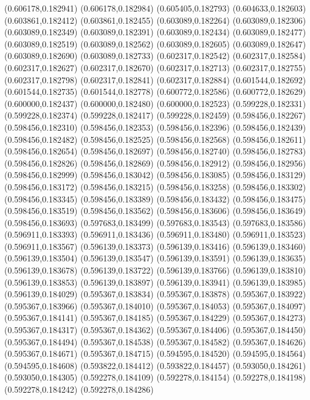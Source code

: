(0.606178,0.182941)
(0.606178,0.182984)
(0.605405,0.182793)
(0.604633,0.182603)
(0.603861,0.182412)
(0.603861,0.182455)
(0.603089,0.182264)
(0.603089,0.182306)
(0.603089,0.182349)
(0.603089,0.182391)
(0.603089,0.182434)
(0.603089,0.182477)
(0.603089,0.182519)
(0.603089,0.182562)
(0.603089,0.182605)
(0.603089,0.182647)
(0.603089,0.182690)
(0.603089,0.182733)
(0.602317,0.182542)
(0.602317,0.182584)
(0.602317,0.182627)
(0.602317,0.182670)
(0.602317,0.182713)
(0.602317,0.182755)
(0.602317,0.182798)
(0.602317,0.182841)
(0.602317,0.182884)
(0.601544,0.182692)
(0.601544,0.182735)
(0.601544,0.182778)
(0.600772,0.182586)
(0.600772,0.182629)
(0.600000,0.182437)
(0.600000,0.182480)
(0.600000,0.182523)
(0.599228,0.182331)
(0.599228,0.182374)
(0.599228,0.182417)
(0.599228,0.182459)
(0.598456,0.182267)
(0.598456,0.182310)
(0.598456,0.182353)
(0.598456,0.182396)
(0.598456,0.182439)
(0.598456,0.182482)
(0.598456,0.182525)
(0.598456,0.182568)
(0.598456,0.182611)
(0.598456,0.182654)
(0.598456,0.182697)
(0.598456,0.182740)
(0.598456,0.182783)
(0.598456,0.182826)
(0.598456,0.182869)
(0.598456,0.182912)
(0.598456,0.182956)
(0.598456,0.182999)
(0.598456,0.183042)
(0.598456,0.183085)
(0.598456,0.183129)
(0.598456,0.183172)
(0.598456,0.183215)
(0.598456,0.183258)
(0.598456,0.183302)
(0.598456,0.183345)
(0.598456,0.183389)
(0.598456,0.183432)
(0.598456,0.183475)
(0.598456,0.183519)
(0.598456,0.183562)
(0.598456,0.183606)
(0.598456,0.183649)
(0.598456,0.183693)
(0.597683,0.183499)
(0.597683,0.183543)
(0.597683,0.183586)
(0.596911,0.183393)
(0.596911,0.183436)
(0.596911,0.183480)
(0.596911,0.183523)
(0.596911,0.183567)
(0.596139,0.183373)
(0.596139,0.183416)
(0.596139,0.183460)
(0.596139,0.183504)
(0.596139,0.183547)
(0.596139,0.183591)
(0.596139,0.183635)
(0.596139,0.183678)
(0.596139,0.183722)
(0.596139,0.183766)
(0.596139,0.183810)
(0.596139,0.183853)
(0.596139,0.183897)
(0.596139,0.183941)
(0.596139,0.183985)
(0.596139,0.184029)
(0.595367,0.183834)
(0.595367,0.183878)
(0.595367,0.183922)
(0.595367,0.183966)
(0.595367,0.184010)
(0.595367,0.184053)
(0.595367,0.184097)
(0.595367,0.184141)
(0.595367,0.184185)
(0.595367,0.184229)
(0.595367,0.184273)
(0.595367,0.184317)
(0.595367,0.184362)
(0.595367,0.184406)
(0.595367,0.184450)
(0.595367,0.184494)
(0.595367,0.184538)
(0.595367,0.184582)
(0.595367,0.184626)
(0.595367,0.184671)
(0.595367,0.184715)
(0.594595,0.184520)
(0.594595,0.184564)
(0.594595,0.184608)
(0.593822,0.184412)
(0.593822,0.184457)
(0.593050,0.184261)
(0.593050,0.184305)
(0.592278,0.184109)
(0.592278,0.184154)
(0.592278,0.184198)
(0.592278,0.184242)
(0.592278,0.184286)
